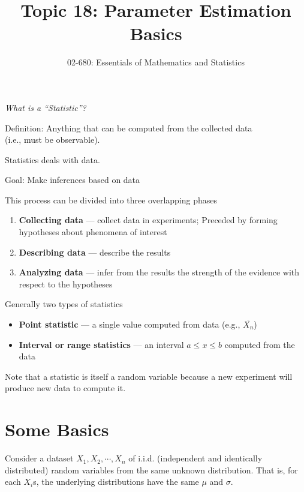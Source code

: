 

\title{Topic 18: Parameter Estimation Basics}
\author{02-680: Essentials of Mathematics and Statistics}


\maketitle


\emph{What is a ``Statistic''?}
\begin{center}
Definition: Anything that can be computed from the collected data\\ (i.e., must be observable).
\end{center}

Statistics deals with data.

Goal: Make inferences based on data

This process can be divided into three overlapping phases
\begin{enumerate}
\item \textbf{Collecting data} --- collect data in experiments; Preceded by forming hypotheses about phenomena of interest 
\item \textbf{Describing data} --- describe the results
\item \textbf{Analyzing data} --- infer from the results the strength of the evidence with respect to the hypotheses
\end{enumerate}

Generally two types of statistics
\begin{itemize}
\item[] \textbf{Point statistic} --- a single value computed from data (e.g., $\overline{X_n}$)
\item[] \textbf{Interval or range statistics} ---  an interval $a\le x \le b$ computed from the data
\end{itemize} 

Note that a statistic is itself a random variable 
because a new experiment will produce new data to compute it.

\section{Some Basics}

Consider a dataset $X_1, X_2, \cdots, X_n$ of i.i.d. (independent and identically distributed) random variables from the same unknown distribution. 
That is, for each $X_i$s, the underlying distributions have the same $\mu$ and $\sigma$. 

